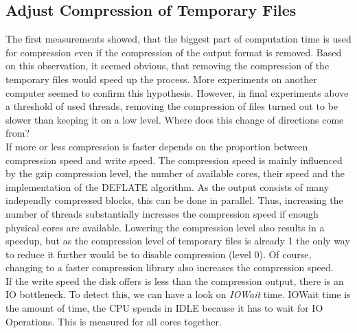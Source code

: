 \subsection{Adjust Compression of Temporary Files}
The first measurements showed, that the biggest part of computation time is used for compression even if the compression of the output format is removed. Based on this observation, it seemed obvious, that removing the compression of the temporary files would speed up the process. More experiments on another computer seemed to confirm this hypothesis. However, in final experiments above a threshold of used threads, removing the compression of files turned out to be slower than keeping it on a low level. Where does this change of directions come from? \\
If more or less compression is faster depends on the proportion between compression speed and write speed. The compression speed is mainly influenced by the gzip compression level, the number of available cores, their speed and the implementation of the DEFLATE algorithm. As the output consists of many independly compressed blocks, this can be done in parallel. Thus, increasing the number of threads substantially increases the compression speed if enough physical cores are available. Lowering the compression level also results in a speedup, but as the compression level of temporary files is already 1 the only way to reduce it further would be to disable compression (level 0). Of course, changing to a faster compression library also increases the compression speed. \\
If the write speed the disk offers is less than the compression output, there is an IO bottleneck. To detect this, we can have a look on \textit{IOWait} time. IOWait time is the amount of time, the CPU spends in IDLE because it has to wait for IO Operations. This is measured for all cores together. 
